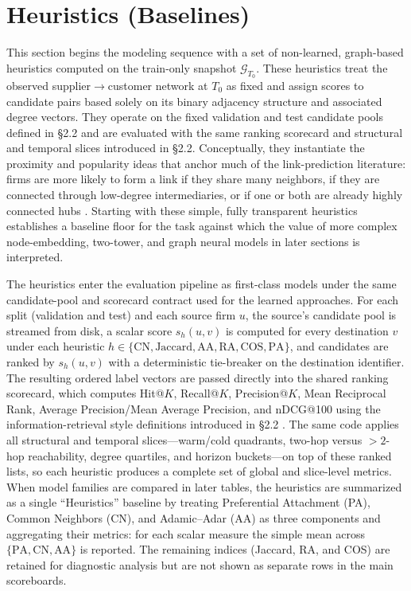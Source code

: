 \section{Heuristics (Baselines)}

This section begins the modeling sequence with a set of non-learned, graph-based heuristics computed on the train-only snapshot \(\mathcal{G}_{T_0}\). These heuristics treat the observed supplier\(\rightarrow\)customer network at \(T_0\) as fixed and assign scores to candidate pairs based solely on its binary adjacency structure and associated degree vectors. They operate on the fixed validation and test candidate pools defined in \S2.2 and are evaluated with the same ranking scorecard and structural and temporal slices introduced in \S2.2. Conceptually, they instantiate the proximity and popularity ideas that anchor much of the link-prediction literature: firms are more likely to form a link if they share many neighbors, if they are connected through low-degree intermediaries, or if one or both are already highly connected hubs \parencite{liben-nowell_link_2003,lu_link_2011}. Starting with these simple, fully transparent heuristics establishes a baseline floor for the task against which the value of more complex node-embedding, two-tower, and graph neural models in later sections is interpreted.

The heuristics enter the evaluation pipeline as first-class models under the same candidate-pool and scorecard contract used for the learned approaches. For each split (validation and test) and each source firm \(u\), the source's candidate pool is streamed from disk, a scalar score \(s_h(u,v)\) is computed for every destination \(v\) under each heuristic \(h \in \{\text{CN},\text{Jaccard},\text{AA},\text{RA},\text{COS},\text{PA}\}\), and candidates are ranked by \(s_h(u,v)\) with a deterministic tie-breaker on the destination identifier. The resulting ordered label vectors are passed directly into the shared ranking scorecard, which computes Hit@\(K\), Recall@\(K\), Precision@\(K\), Mean Reciprocal Rank, Average Precision/Mean Average Precision, and nDCG@100 using the information-retrieval style definitions introduced in \S2.2 \parencite{manning_introduction_2008,herlocker_evaluating_2004}. The same code applies all structural and temporal slices---warm/cold quadrants, two-hop versus \(>2\)-hop reachability, degree quartiles, and horizon buckets---on top of these ranked lists, so each heuristic produces a complete set of global and slice-level metrics. When model families are compared in later tables, the heuristics are summarized as a single ``Heuristics'' baseline by treating Preferential Attachment (PA), Common Neighbors (CN), and Adamic--Adar (AA) as three components and aggregating their metrics: for each scalar measure the simple mean across \(\{\text{PA},\text{CN},\text{AA}\}\) is reported. The remaining indices (Jaccard, RA, and COS) are retained for diagnostic analysis but are not shown as separate rows in the main scoreboards.

